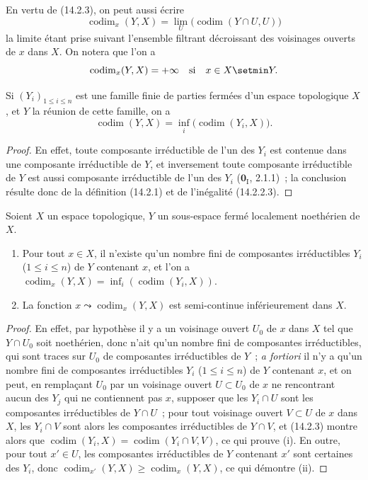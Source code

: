En vertu de (14.2.3), on peut aussi écrire
\[
  \operatorname{codim}_x(Y,X)=
  \lim_U\bigl(\operatorname{codim}(Y\cap U,U)\bigr)
  \tag{14.2.4.1}\label{0.14.2.4.1-fr}
\]
la limite étant prise suivant l'ensemble filtrant décroissant des voisinages
ouverts de $x$ dans $X$. On notera que l'on a
\[
  \operatorname{codim}_x(Y,X)=+\infty\quad\text{si}\quad x\in X\setmin Y.
\]

\begin{proposition}[14.2.5]
\label{0.14.2.5-fr}
Si $(Y_i)_{1\leq i\leq n}$ est une famille finie de parties fermées d'un
espace topologique $X$, et $Y$ la réunion de cette famille, on a
\[
  \operatorname{codim}(Y,X)=
  \inf_i\bigl(\operatorname{codim}(Y_i,X)\bigr).
  \tag{14.2.5.1}\label{0.14.2.5.1-fr}
\]
\end{proposition}

\begin{proof}
En effet, toute composante irréductible de l'un des $Y_i$ est contenue dans
une composante irréductible de $Y$, et inversement toute composante
irréductible de $Y$ est aussi composante irréductible de l'un des $Y_i$
($\mathbf{0}_{\mathrm I}$, 2.1.1)~; la conclusion résulte donc de la définition
(14.2.1) et de l'inégalité (14.2.2.3).
\end{proof}

\begin{corollary}[14.2.6]
\label{0.14.2.6-fr}
Soient $X$ un espace topologique, $Y$ un sous-espace fermé localement
noethérien de $X$.
\begin{enumerate}
  \item[\rm(i)] Pour tout $x\in X$, il n'existe qu'un nombre fini de
  composantes irréductibles $Y_i$ \textup{($1\leq i\leq n$)} de $Y$ contenant $x$,
  et l'on a
  $\operatorname{codim}_x(Y,X)=
  \inf_i(\operatorname{codim}(Y_i,X))$.
  \item[\rm(ii)] La fonction
  $x\leadsto\operatorname{codim}_x(Y,X)$ est semi-continue inférieurement
  dans $X$.
\end{enumerate}
\end{corollary}

\begin{proof}
En effet, par hypothèse il y a un voisinage ouvert $U_0$ de $x$ dans $X$ tel
que $Y\cap U_0$ soit noethérien, donc n'ait qu'un nombre fini de composantes
irréductibles, qui sont traces sur $U_0$ de composantes irréductibles de $Y$~;
\emph{a fortiori} il n'y a qu'un nombre fini de composantes irréductibles
$Y_i$ ($1\leq i\leq n$) de $Y$ contenant $x$, et on peut, en remplaçant $U_0$
par un voisinage ouvert $U\subset U_0$ de $x$ ne rencontrant aucun des $Y_j$
qui ne contiennent pas $x$, supposer que les $Y_i\cap U$ sont les composantes
irréductibles de $Y\cap U$~; pour tout voisinage ouvert $V\subset U$ de $x$
dans $X$, les $Y_i\cap V$ sont alors les composantes irréductibles de
$Y\cap V$, et (14.2.3) montre alors que
$\operatorname{codim}(Y_i,X)=\operatorname{codim}(Y_i\cap V,V)$, ce qui
prouve (i). En outre, pour tout $x'\in U$, les composantes irréductibles de
$Y$ contenant $x'$ sont certaines des $Y_i$, donc
$\operatorname{codim}_{x'}(Y,X)\geq\operatorname{codim}_x(Y,X)$, ce qui
démontre (ii).
\end{proof}


